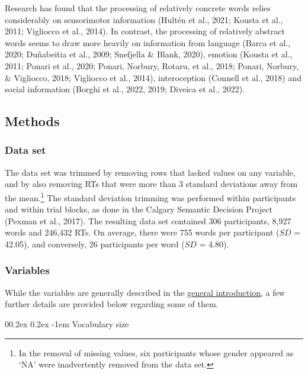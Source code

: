\documentclass[
  12pt,
  man,floatsintext]{apa7}
\makeatletter
\let\oldparagraph\paragraph
\renewcommand{\paragraph}[1]{\oldparagraph{#1}\mbox{}}
\renewcommand{\paragraph}{\@startsection{paragraph}{4}{\parindent}%
  {0\baselineskip \@plus 0.2ex \@minus 0.2ex}%
  {-1em}%
  {\normalfont\normalsize\bfseries\itshape\typesectitle}}
\makeatother
\begin{document}
Research has found that the processing of relatively concrete words relies considerably on sensorimotor information (Hultén et al., 2021; Kousta et al., 2011; Vigliocco et al., 2014). In contrast, the processing of relatively abstract words seems to draw more heavily on information from language (Barca et al., 2020; Duñabeitia et al., 2009; Snefjella \& Blank, 2020), emotion (Kousta et al., 2011; Ponari et al., 2020; Ponari, Norbury, Rotaru, et al., 2018; Ponari, Norbury, \& Vigliocco, 2018; Vigliocco et al., 2014), interoception (Connell et al., 2018) and social information (Borghi et al., 2022, 2019; Diveica et al., 2022).

\hypertarget{methods-1}{%
\subsection{Methods}\label{methods-1}}

\hypertarget{data-set}{%
\subsubsection{Data set}\label{data-set}}

The data set was trimmed by removing rows that lacked values on any variable, and by also removing RTs that were more than 3 standard deviations away from the mean.\footnote{In the removal of missing values, six participants whose gender appeared as `NA' were inadvertently removed from the data set.} The standard deviation trimming was performed within participants and within trial blocks, as done in the Calgary Semantic Decision Project (Pexman et al., 2017). The resulting data set contained 306 participants, 8,927 words and 246,432 RTs. On average, there were 755 words per participant (\(SD\) = 42.05), and conversely, 26 participants per word (\(SD\) = 4.80).

\hypertarget{variables-1}{%
\subsubsection{Variables}\label{variables-1}}

While the variables are generally described in the \protect\hyperlink{present-studies}{\underline{general introduction}}, a few further details are provided below regarding some of them.

\hypertarget{vocabulary-size}{%
\paragraph{Vocabulary size}\label{vocabulary-size}}
\end{document}
